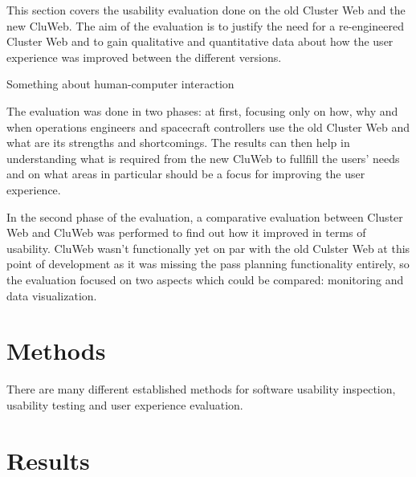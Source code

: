 
This section covers the usability evaluation done on the old Cluster Web and the new CluWeb. The aim of the evaluation is to justify the need for a re-engineered Cluster Web and to gain qualitative and quantitative data about how the user experience was improved between the different versions.

Something about human-computer interaction \cite{4839639}

The evaluation was done in two phases: at first, focusing only on how, why and when operations engineers and spacecraft controllers use the old Cluster Web and what are its strengths and shortcomings. The results can then help in understanding what is required from the new CluWeb to fullfill the users' needs and on what areas in particular should be a focus for improving the user experience.

In the second phase of the evaluation, a comparative evaluation between Cluster Web and CluWeb was performed to find out how it improved in terms of usability. CluWeb wasn't functionally yet on par with the old Culster Web at this point of development as it was missing the pass planning functionality entirely, so the evaluation focused on two aspects which could be compared: monitoring and data visualization.

\section{Methods}

There are many different established methods for software usability inspection, usability testing and user experience evaluation. 

\cite{nielsen1995usability, hollingsed2007usability, holzinger2005usability, rubin2008handbook, dumas1999practical, vermeeren2010user, bevan2009difference, vaananen2008towards, laugwitz2008construction, obrist2009user, battleson2001usability, van2003retrospective}

\section{Results}